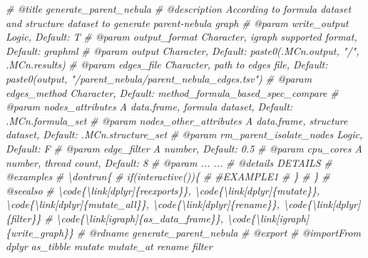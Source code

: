 \documentclass[
]{article}
\newenvironment{Shaded}{\begin{snugshade}}{\end{snugshade}}
\newcommand{\CommentTok}[1]{\textcolor[rgb]{0.56,0.35,0.01}{\textit{#1}}}
\begin{document}
\begin{Shaded}
\begin{Highlighting}[]
\CommentTok{\#\textquotesingle{} @title generate\_parent\_nebula}
\CommentTok{\#\textquotesingle{} @description According to formula dataset and structure dataset to generate parent{-}nebula graph}
\CommentTok{\#\textquotesingle{} @param write\_output Logic, Default: T}
\CommentTok{\#\textquotesingle{} @param output\_format Character, \textquotesingle{}igraph\textquotesingle{} supported format, Default: \textquotesingle{}graphml\textquotesingle{}}
\CommentTok{\#\textquotesingle{} @param output Character, Default: paste0(.MCn.output, "/", .MCn.results)}
\CommentTok{\#\textquotesingle{} @param edges\_file Character, path to edges file, Default: paste0(output, "/parent\_nebula/parent\_nebula\_edges.tsv")}
\CommentTok{\#\textquotesingle{} @param edges\_method Character, Default: \textquotesingle{}method\_formula\_based\_spec\_compare\textquotesingle{}}
\CommentTok{\#\textquotesingle{} @param nodes\_attributes A data.frame, formula dataset, Default: .MCn.formula\_set}
\CommentTok{\#\textquotesingle{} @param nodes\_other\_attributes A data.frame, structure dataset, Default: .MCn.structure\_set}
\CommentTok{\#\textquotesingle{} @param rm\_parent\_isolate\_nodes Logic, Default: F}
\CommentTok{\#\textquotesingle{} @param edge\_filter A number, Default: 0.5}
\CommentTok{\#\textquotesingle{} @param cpu\_cores A number, thread count, Default: 8}
\CommentTok{\#\textquotesingle{} @param ... ...}
\CommentTok{\#\textquotesingle{} @details DETAILS}
\CommentTok{\#\textquotesingle{} @examples }
\CommentTok{\#\textquotesingle{} \textbackslash{}dontrun\{}
\CommentTok{\#\textquotesingle{} if(interactive())\{}
\CommentTok{\#\textquotesingle{}  \#EXAMPLE1}
\CommentTok{\#\textquotesingle{}  \}}
\CommentTok{\#\textquotesingle{} \}}
\CommentTok{\#\textquotesingle{} @seealso }
\CommentTok{\#\textquotesingle{}  \textbackslash{}code\{\textbackslash{}link[dplyr]\{reexports\}\}, \textbackslash{}code\{\textbackslash{}link[dplyr]\{mutate\}\}, \textbackslash{}code\{\textbackslash{}link[dplyr]\{mutate\_all\}\}, \textbackslash{}code\{\textbackslash{}link[dplyr]\{rename\}\}, \textbackslash{}code\{\textbackslash{}link[dplyr]\{filter\}\}}
\CommentTok{\#\textquotesingle{}  \textbackslash{}code\{\textbackslash{}link[igraph]\{as\_data\_frame\}\}, \textbackslash{}code\{\textbackslash{}link[igraph]\{write\_graph\}\}}
\CommentTok{\#\textquotesingle{} @rdname generate\_parent\_nebula}
\CommentTok{\#\textquotesingle{} @export }
\CommentTok{\#\textquotesingle{} @importFrom dplyr as\_tibble mutate mutate\_at rename filter}

\end{Highlighting}
\end{Shaded}
\end{document}
